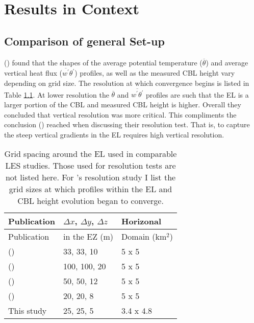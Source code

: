 
\chapter{Results in Context}
\label{ch:results}
\setlength{\parindent}{0cm}

\section{Comparison of general Set-up}
\FloatBarrier

\citeauthor{SullPat} (\citeyear{SullPat}) found that the shapes of the average potential temperature ($\overline{\theta}$) and average vertical heat flux ($\overline{w^{'}}\theta^{'}$) profiles, as well as the measured \acs{CBL} height vary depending on grid size.  The resolution at which convergence begins is listed in Table \ref{table:gridcomp}.  At lower resolution the $\overline{\theta}$ and $\overline{w^{'}\theta^{'}}$ profiles are such that the \acs{EL} is a larger portion of the \acs{CBL} and measured \acs{CBL} height is higher.  Overall they concluded that vertical resolution was more critical.  This compliments the conclusion \citeauthor{BrooksFowler2} (\citeyear{BrooksFowler2}) reached when discussing their resolution test.  That is, to capture the steep vertical gradients in the \acs{EL} requires high vertical resolution. \\

\begin{table}[htbp]
\caption[]{Grid spacing around the \acs{EL} used in comparable \acs{LES} studies. Those used for resolution tests are not listed here.  For \citeauthor{SullPat}'s \citeyear{SullPat} resolution study I list the grid sizes at which profiles within the \acs{EL} and \acs{CBL} height evolution began to converge.}

    \begin{center}
    \begin{tabular}{ p{5cm} p{3cm} p{3cm}}
Publication & $\Delta x$, $\Delta y$, $\Delta z$ & Horizonal \\ \hline
Publication & in the \acs{EZ} (m)& Domain (km$^{2}$) \\ \hline
      \citeauthor{SullMoengStev} (\citeyear{SullMoengStev}) & 33, 33, 10 & 5 x 5 \\ %
      \citeauthor{FedConzMir04} (\citeyear{FedConzMir04}) & 100, 100, 20 & 5 x 5 \\ [.3cm] %
      \citeauthor{BrooksFowler2} (\citeyear{BrooksFowler2}) & 50, 50, 12 & 5 x 5 \\%
      \citeauthor{SullPat} (\citeyear{SullPat}) &  20, 20, 8 & 5 x 5\\ %
      This study & 25, 25, 5 &  3.4 x 4.8\\ \hline       
    \end{tabular}
\label{table:gridcomp}   
\end{center}    
\end{table}


